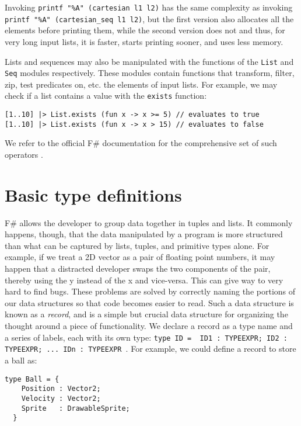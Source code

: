Invoking \texttt{printf "\%A" (cartesian l1 l2)} has the same complexity as invoking \texttt{printf "\%A" (cartesian\_seq l1 l2)}, but the first version also allocates all the elements before printing them, while the second version does not and thus, for very long input lists, it is faster, starts printing sooner, and uses less memory.

Lists and sequences may also be manipulated with the functions of the \texttt{List} and \texttt{Seq} modules respectively. These modules contain functions that transform, filter, zip, test predicates on, etc. the elements of input lists. For example, we may check if a list contains a value with the \texttt{exists} function:

\begin{lstlisting}
[1..10] |> List.exists (fun x -> x >= 5) // evaluates to true
[1..10] |> List.exists (fun x -> x > 15) // evaluates to false
\end{lstlisting}

We refer to the official F\# documentation for the comprehensive set of such operators \cite{APPENDIX_F_FSHARP_MSDN}.


\section{Basic type definitions}
F\# allows the developer to group data together in tuples and lists. It commonly happens, though, that the data manipulated by a program is more structured than what can be captured by lists, tuples, and primitive types alone. For example, if we treat a 2D vector as a pair of floating point numbers, it may happen that a distracted developer swaps the two components of the pair, thereby using the y instead of the x and vice-versa. This can give way to very hard to find bugs. These problems are solved by correctly naming the portions of our data structures so that code becomes easier to read. Such a data structure is known as a \textit{record}, and is a simple but crucial data structure for organizing the thought around a piece of functionality. We declare a record as a type name and a series of labels, each with its own type: \texttt{type ID = { ID1 : TYPEEXPR; ID2 : TYPEEXPR; ... IDn : TYPEEXPR }}. For example, we could define a record to store a ball as:

\begin{lstlisting}
type Ball = {
    Position : Vector2;
    Velocity : Vector2;
    Sprite   : DrawableSprite;
  }
\end{lstlisting}

